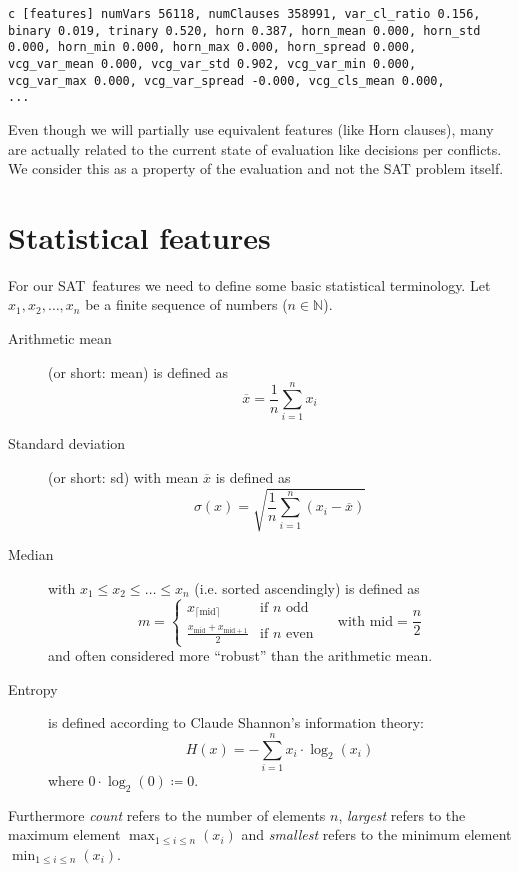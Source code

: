 \begin{verbatim}
c [features] numVars 56118, numClauses 358991, var_cl_ratio 0.156,
binary 0.019, trinary 0.520, horn 0.387, horn_mean 0.000, horn_std
0.000, horn_min 0.000, horn_max 0.000, horn_spread 0.000,
vcg_var_mean 0.000, vcg_var_std 0.902, vcg_var_min 0.000,
vcg_var_max 0.000, vcg_var_spread -0.000, vcg_cls_mean 0.000,
...
\end{verbatim}

Even though we will partially use equivalent features (like Horn clauses),
many are actually related to the current state of evaluation like decisions
per conflicts. We consider this as a property of the evaluation and not the
SAT problem itself.

\section{Statistical features}
\label{sec:features-stats}
%
For our SAT~features we need to define some basic statistical terminology.
Let $x_1, x_2, \ldots, x_n$ be a finite sequence of numbers ($n \in \mathbb N$).
\begin{description}
  \item[Arithmetic mean] (or short: mean)
    is defined as
    \[ \overline{x} = \frac1n \sum_{i=1}^n x_i \]
  \item[Standard deviation] (or short: sd)
    with mean $\overline{x}$ is defined as
    \[ \sigma(x) = \sqrt{\frac1n \sum_{i=1}^n (x_i - \overline{x})} \]
  \item[Median]
    with $x_1 \leq x_2 \leq \ldots \leq x_n$
    (i.e. sorted ascendingly) is defined as
    \[
       m = \begin{cases}
         x_{\lceil \text{mid}\rceil} & \text{if } n \text{ odd} \\
         \frac{x_{\text{mid}} + x_{\text{mid} + 1}}{2} & \text{if } n \text{ even}
       \end{cases}
       \quad\text{ with } \text{mid} = \frac{n}{2}
    \]
    and often considered more \enquote{robust} than the arithmetic mean.
  \item[Entropy]
    is defined according to Claude Shannon's information theory:
    \[ H(x) = -\sum_{i=1}^n x_i \cdot \log_2(x_i) \]
    where $0 \cdot \log_2(0) \coloneqq 0$.
\end{description}

Furthermore \emph{count} refers to the number of elements $n$,
\emph{largest} refers to the maximum element $\max_{1 \leq i \leq n}(x_i)$
and \emph{smallest} refers to the minimum element $\min_{1 \leq i \leq n}(x_i)$.

